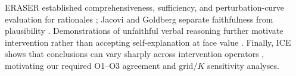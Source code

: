 ERASER established comprehensiveness, sufficiency, and perturbation-curve
evaluation for rationales \cite{deyoung2020eraser}; Jacovi and Goldberg separate
faithfulness from plausibility \cite{jacovi2020faithfulness}. Demonstrations of
unfaithful verbal reasoning further motivate intervention rather than accepting
self-explanation at face value \cite{turpin2023unfaithful,lanham2023faithfulness}.
Finally, ICE shows that conclusions can vary sharply across intervention
operators \cite{basu2026ice}, motivating our required O1--O3 agreement and
grid/$K$ sensitivity analyses.
